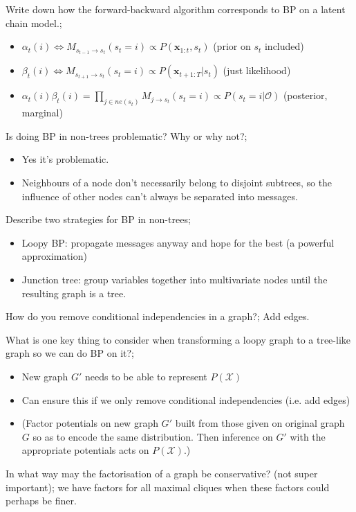 \documentclass{article}
\begin{document}
Write down how the forward-backward algorithm corresponds to BP on a latent chain model.; \begin{itemize} \item $\alpha_t(i)\Leftrightarrow M_{s_{t-1}\rightarrow s_t}(s_t = i)\propto P(\mathbf{x}_{1:t},s_t)$ (prior on $s_t$ included) \item $\beta_t(i)\Leftrightarrow M_{s_{t+1}\rightarrow s_t}(s_t = i)\propto P(\mathbf{x}_{t+1:T}|s_t)$ (just likelihood) \item $\alpha_t(i)\beta_t(i) =  \prod_{j\in ne(s_t)} M_{j\rightarrow s_t}(s_t = i)\propto P(s_t=i|\mathcal{O})$ (posterior, marginal) \end{itemize}

Is doing BP in non-trees problematic? Why or why not?; \begin{itemize} \item Yes it's problematic.  \item Neighbours of a node don't necessarily belong to disjoint subtrees, so the influence of other nodes can't always be separated into messages.  \end{itemize}

Describe two strategies for BP in non-trees; \begin{itemize} \item Loopy BP: propagate messages anyway and hope for the best (a powerful approximation) \item Junction tree: group variables together into multivariate nodes until the resulting graph is a tree.  \end{itemize}

How do you remove conditional independencies in a graph?; Add edges.

What is one key thing to consider when transforming a loopy graph to a tree-like graph so we can do BP on it?; \begin{itemize} \item New graph $G'$ needs to be able to represent $P(\mathcal{X})$ \item Can ensure this if we only remove conditional independencies (i.e. add edges) \item (Factor potentials on new graph $G'$ built from those given on original graph $G$ so as to encode the same distribution. Then inference on $G'$ with the appropriate potentials acts on $P(\mathcal{X})$.) \end{itemize}

In what way may the factorisation of a graph be conservative? (not super important); we have factors for all maximal cliques when these factors could perhaps be finer.
\end{document}
